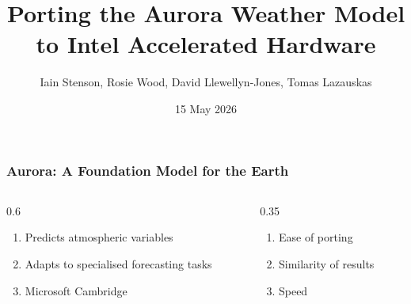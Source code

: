 \documentclass[
	notes=none,
	aspectratio=169
]{beamer}
\begin{document}
\title{Porting the Aurora Weather Model to Intel Accelerated Hardware}
\subtitle{}
\author{Iain Stenson, Rosie Wood, David Llewellyn-Jones, Tomas Lazauskas}
\date{15 May 2026}
\def\cornerimagefilename{aurora-title.jpg}


\renewcommand{\thefootnote}{\arabic{footnote}}

\frame{
\titlepage
}
\note{
}

\renewcommand{\thefootnote}{\fnsymbol{footnote}}


\begin{frame}
\frametitle{Aurora: A Foundation Model for the Earth}

\begin{columns}[T]
\begin{column}[T]{0.6\textwidth}
\setlength{\parskip}{0.5em}

\vspace{0.0cm}
\begin{enumerate}
\setlength{\parskip}{0.5em}
\item Predicts atmospheric variables
\item Adapts to specialised forecasting tasks
\item Microsoft Cambridge
\end{enumerate}

\end{column}
\begin{column}[T]{0.35\textwidth}
\setlength{\parskip}{0.5em}

\vspace{0.0cm}
\begin{enumerate}
\setlength{\parskip}{0.5em}
\item Ease of porting
\item Similarity of results
\item Speed
\end{enumerate}

\end{column}
\end{columns}

\end{frame}
\note{
}

\end{document}
